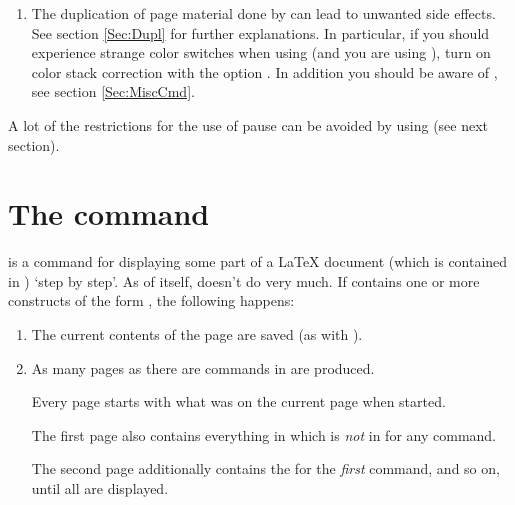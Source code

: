 \begin{slide}
\begin{enumerate}
    \newslide

  \item The duplication of page material done by  can lead to unwanted side effects. See section
    \ref{Sec:Dupl} for further explanations. In particular, if you should experience strange color switches when using
     (and you are  using ), turn on color stack correction with the option
    . In addition you should be aware of , see section
    \ref{Sec:MiscCmd}.

  \end{enumerate}

  A lot of the restrictions for the use of pause can be avoided by using  (see next section).

  \newslide

  \section{The  command}
   is a command for displaying some part of a \LaTeX{} document (which
  is contained in ) `step by step'. As of itself,  doesn't do very much. If
   contains one or more constructs of the form , the
  following happens:
  \begin{enumerate}
  \item The current contents of the page are saved (as with ).

  \item As many pages as there are  commands in  are produced.

    Every page starts with what was on the current page when  started.

    \newslide

    The first page also contains everything in  which is \emph{not} in  for any
     command.

    The second page additionally contains the  for the \emph{first}  command, and so
    on, until all  are displayed.


\end{enumerate}
\end{slide}
